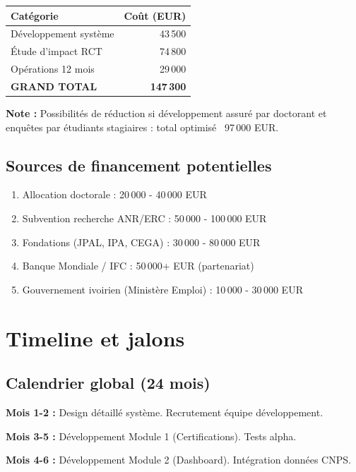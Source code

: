\documentclass[12pt]{article}
\begin{document}
\begin{table}[h]
\centering
\begin{tabular}{lr}
\toprule
\textbf{Catégorie} & \textbf{Coût (EUR)} \\
\midrule
Développement système & 43\,500 \\
Étude d'impact RCT & 74\,800 \\
Opérations 12 mois & 29\,000 \\
\midrule
\textbf{GRAND TOTAL} & \textbf{147\,300} \\
\bottomrule
\end{tabular}
\end{table}

\textbf{Note :} Possibilités de réduction si développement assuré par doctorant et enquêtes par étudiants stagiaires : total optimisé ~97\,000 EUR.

\subsection{Sources de financement potentielles}

\begin{enumerate}
    \item Allocation doctorale : 20\,000 - 40\,000 EUR
    \item Subvention recherche ANR/ERC : 50\,000 - 100\,000 EUR
    \item Fondations (JPAL, IPA, CEGA) : 30\,000 - 80\,000 EUR
    \item Banque Mondiale / IFC : 50\,000+ EUR (partenariat)
    \item Gouvernement ivoirien (Ministère Emploi) : 10\,000 - 30\,000 EUR
\end{enumerate}

\section{Timeline et jalons}

\subsection{Calendrier global (24 mois)}

\textbf{Mois 1-2 :} Design détaillé système. Recrutement équipe développement.

\textbf{Mois 3-5 :} Développement Module 1 (Certifications). Tests alpha.

\textbf{Mois 4-6 :} Développement Module 2 (Dashboard). Intégration données CNPS.
\end{document}
